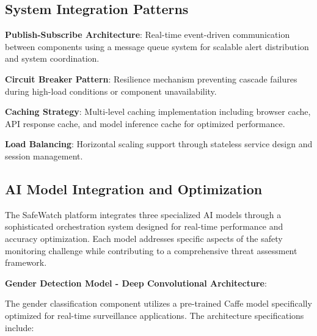 \documentclass[12pt,a4paper]{article}
\begin{document}
\subsection{System Integration Patterns}

\textbf{Publish-Subscribe Architecture}: Real-time event-driven communication between components using a message queue system for scalable alert distribution and system coordination.

\textbf{Circuit Breaker Pattern}: Resilience mechanism preventing cascade failures during high-load conditions or component unavailability.

\textbf{Caching Strategy}: Multi-level caching implementation including browser cache, API response cache, and model inference cache for optimized performance.

\textbf{Load Balancing}: Horizontal scaling support through stateless service design and session management.

\subsection{AI Model Integration and Optimization}

The SafeWatch platform integrates three specialized AI models through a sophisticated orchestration system designed for real-time performance and accuracy optimization. Each model addresses specific aspects of the safety monitoring challenge while contributing to a comprehensive threat assessment framework.

\textbf{Gender Detection Model - Deep Convolutional Architecture}:

The gender classification component utilizes a pre-trained Caffe model specifically optimized for real-time surveillance applications. The architecture specifications include:
\end{document}
